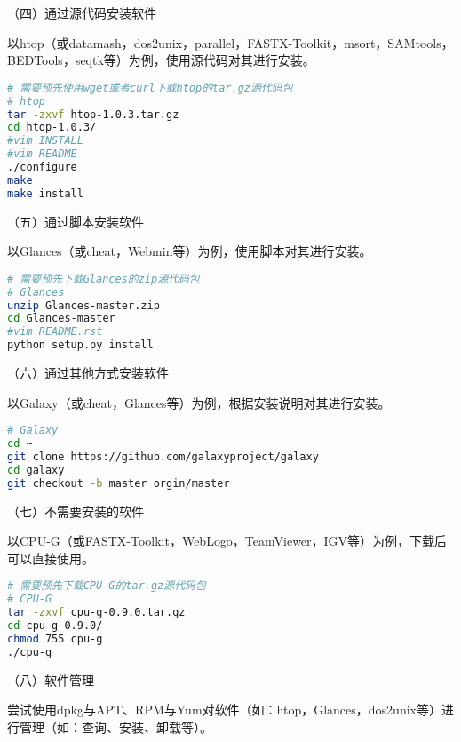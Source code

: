 \vspace{0.1in}
（四）通过源代码安装软件

以htop（或datamash，dos2unix，parallel，FASTX-Toolkit，msort，SAMtools，BEDTools，seqtk等）为例，使用源代码对其进行安装。
\begin{lstlisting}[language=bash]
# 需要预先使用wget或者curl下载htop的tar.gz源代码包
# htop
tar -zxvf htop-1.0.3.tar.gz
cd htop-1.0.3/
#vim INSTALL
#vim README
./configure
make
make install
\end{lstlisting}

\vspace{0.1in}
（五）通过脚本安装软件

以Glances（或cheat，Webmin等）为例，使用脚本对其进行安装。
\begin{lstlisting}[language=bash]
# 需要预先下载Glances的zip源代码包
# Glances
unzip Glances-master.zip
cd Glances-master
#vim README.rst
python setup.py install
\end{lstlisting}

\vspace{0.1in}
（六）通过其他方式安装软件

以Galaxy（或cheat，Glances等）为例，根据安装说明对其进行安装。
\begin{lstlisting}[language=bash]
# Galaxy
cd ~
git clone https://github.com/galaxyproject/galaxy
cd galaxy
git checkout -b master orgin/master
\end{lstlisting}

\vspace{0.1in}
（七）不需要安装的软件

以CPU-G（或FASTX-Toolkit，WebLogo，TeamViewer，IGV等）为例，下载后可以直接使用。
\begin{lstlisting}[language=bash]
# 需要预先下载CPU-G的tar.gz源代码包
# CPU-G
tar -zxvf cpu-g-0.9.0.tar.gz
cd cpu-g-0.9.0/
chmod 755 cpu-g
./cpu-g
\end{lstlisting}

\vspace{0.1in}
（八）软件管理

尝试使用dpkg与APT、RPM与Yum对软件（如：htop，Glances，dos2unix等）进行管理（如：查询、安装、卸载等）。

